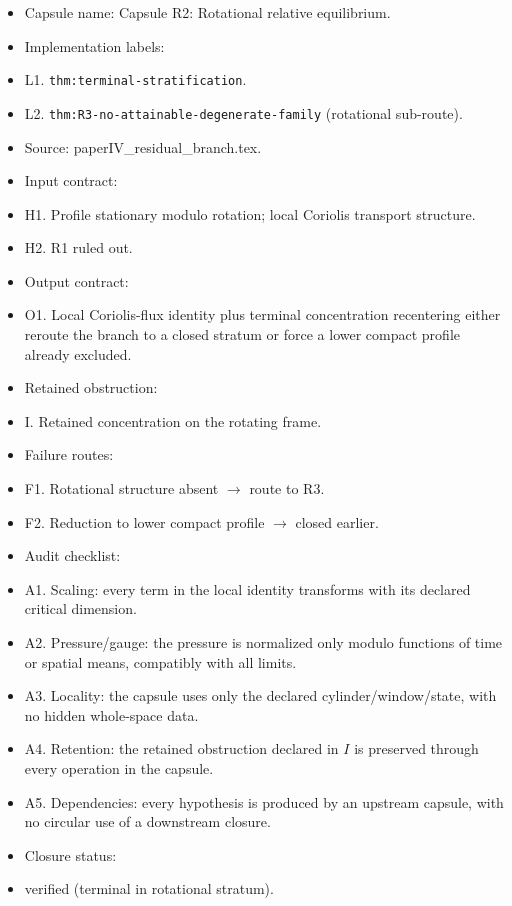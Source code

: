 \documentclass[11pt]{amsart}
\begin{document}
\begin{itemize}
  \item Capsule name: Capsule R2: Rotational relative equilibrium.
  \item Implementation labels:
  \item L1. \texttt{thm:terminal-stratification}.
  \item L2. \texttt{thm:R3-no-attainable-degenerate-family} (rotational sub-route).
  \item Source: paperIV\_residual\_branch.tex.
  \item Input contract:
  \item H1. Profile stationary modulo rotation; local Coriolis transport structure.
  \item H2. R1 ruled out.
  \item Output contract:
  \item O1. Local Coriolis-flux identity plus terminal concentration recentering either reroute the branch to a closed stratum or force a lower compact profile already excluded.
  \item Retained obstruction:
  \item I. Retained concentration on the rotating frame.
  \item Failure routes:
  \item F1. Rotational structure absent $\to$ route to R3.
  \item F2. Reduction to lower compact profile $\to$ closed earlier.
  \item Audit checklist:
  \item A1. Scaling: every term in the local identity transforms with its declared critical dimension.
  \item A2. Pressure/gauge: the pressure is normalized only modulo functions of time or spatial means, compatibly with all limits.
  \item A3. Locality: the capsule uses only the declared cylinder/window/state, with no hidden whole-space data.
  \item A4. Retention: the retained obstruction declared in $I$ is preserved through every operation in the capsule.
  \item A5. Dependencies: every hypothesis is produced by an upstream capsule, with no circular use of a downstream closure.
  \item Closure status:
  \item verified (terminal in rotational stratum).
\end{itemize}
\end{document}

